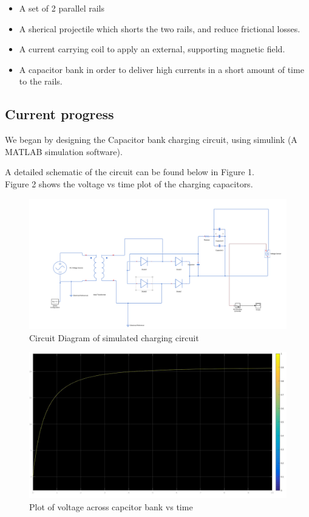 \documentclass[twoside,twocolumn]{article}
\begin{document}
\begin{itemize}
\item A set of 2 parallel rails
\item A sherical projectile which shorts the two rails, and reduce frictional losses.
\item A current carrying coil to apply an external, supporting magnetic field.
\item A capacitor bank in order to deliver high currents in a short amount of time to the rails.
\end{itemize}
\subsection*{\textbf{Current progress}} 
We began by designing the Capacitor bank charging circuit, using simulink (A MATLAB simulation software).

A detailed schematic of the circuit can be found below in Figure 1.
	\\
	
Figure 2 shows the voltage vs time plot of the charging capacitors.
	
\begin{figure}[htp]
	\caption{Circuit Diagram of simulated charging circuit}
	\includegraphics[width=\linewidth]{Circuit.png}
\end{figure}
	
	
\begin{figure}[h]
	\caption{Plot of voltage across capcitor bank vs time }
	\includegraphics[width=\linewidth]{charging.jpg}
\end{figure}
		
\end{document}
